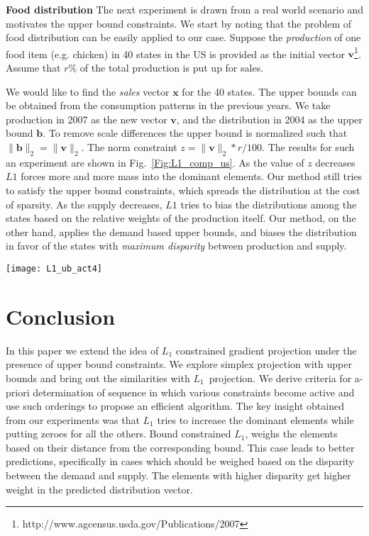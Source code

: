\documentclass{article}
\def\Lo{$L_1$~}
\begin{document}
\textbf{Food distribution}
The next experiment is drawn from a real world scenario and motivates the upper bound constraints.
We start by noting that the problem of food distribution can be easily applied to our case. Suppose the \textit{production} of one food item (e.g. chicken) in 40 states in the US is provided as the initial vector $\mathbf{v}$\footnote{http://www.agcensus.usda.gov/Publications/2007}. Assume that $r\%$ of the total production is put up for sales.

We would like to find the \textit{sales} vector $\mathbf{x}$ for the 40 states. The upper bounds can be obtained from the consumption patterns in the previous years. We take production in 2007 as the new vector $\mathbf{v}$, and the distribution in 2004 as the upper bound $\mathbf{b}$. To remove scale differences the upper bound is normalized such that $\|\mathbf{b}\|_2=\|\mathbf{v}\|_2$. The norm constraint $z=\|\mathbf{v}\|_2*r/100$. The results for such an experiment are shown in Fig.~\ref{Fig:L1_comp_us}. As the value of $z$ decreases $L1$ forces more and more mass into the dominant elements. Our method still tries to satisfy the upper bound constraints, which spreads the distribution at the cost of sparsity. As the supply decreases, $L1$ tries to bias the distributions among the states based on the relative weights of the production itself. Our method, on the other hand, applies the demand based upper bounds, and biases the distribution in favor of the states with \textit{maximum disparity} between production and supply.
\begin{figure*}[htbp!]
\centering
  \texttt{[image: L1\_ub\_act4]}
  \caption{Red: Actual sales of Chicken in 40 states in 2007. Blue: our method with upper bounds. Green: $L1$ only. Note the small region in the circle which has been enlarged. $L1$ completely misses this region whereas our method still provides some value to it.\label{Fig:L1_comp_us}
}
\end{figure*}


\section{Conclusion}\label{SEC:Concl}
In this paper we extend the idea of $L_1$ constrained gradient projection under the presence of upper bound constraints. We explore simplex projection with upper bounds and bring out the similarities with \Lo projection. We derive criteria for a-priori determination of sequence in which various constraints become active and use such orderings to propose an efficient algorithm. The key insight obtained from our experiments was that $L_1$ tries to increase the dominant elements while putting zeroes for all the others. Bound constrained $L_1$, weighs the elements based on their distance from the corresponding bound. This case leads to better predictions, specifically in cases which should be weighed based on the disparity between the demand and supply. The elements with higher disparity get higher weight in the predicted distribution vector.


{

}
\end{document}
